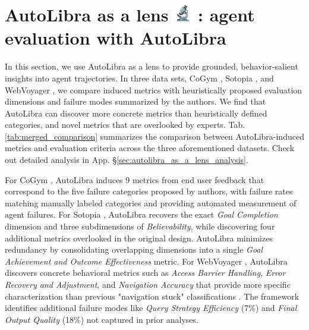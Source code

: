 \section{\texorpdfstring{AutoLibra as a lens
\includegraphics[height=1em]{figs/microscope.png}
: agent evaluation with AutoLibra}{AutoLibra as a lens: agent evaluation with AutoLibra}}
\label{sec:lens}

In this section, we use AutoLibra as a lens to provide grounded, behavior-salient
insights into agent trajectories. In three data sets, CoGym \citep{shao2024collaborative},
Sotopia \citep{zhousotopia}, and WebVoyager \citep{he2024webvoyager}, we compare
induced metrics with heuristically proposed evaluation dimensions and failure modes
summarized by the authors. We find that AutoLibra can discover more concrete
metrics than heuristically defined categories, and novel metrics that are overlooked
by experts. Tab. \ref{tab:merged_comparison} summarizes the comparison between AutoLibra-induced
metrics and evaluation criteria across the three aforementioned datasets. Check out detailed analysis in App. \S\ref{sec:autolibra_as_a_lens_analysis}.

For CoGym \citep{shao2024collaborative}, AutoLibra induces 9 metrics from end user feedback that correspond to the five failure categories proposed by authors, with failure rates matching manually labeled categories and providing automated measurement of agent failures.
For Sotopia \citep{zhousotopia}, AutoLibra recovers the exact \emph{Goal Completion} dimension and three subdimensions of \emph{Believability}, while discovering four additional metrics overlooked in the original design. AutoLibra minimizes redundancy by consolidating overlapping dimensions into a single \textit{Goal Achievement and Outcome Effectiveness} metric.
For WebVoyager \citep{he2024webvoyager}, AutoLibra discovers concrete behavioral metrics such as \textit{Access Barrier Handling}, \textit{Error Recovery and Adjustment}, and \textit{Navigation Accuracy} that provide more specific characterization than previous "navigation stuck" classifications \citep{he2024webvoyager,zhou2024proposeragentevaluatorpaeautonomousskilldiscovery}. The framework identifies additional failure modes like \textit{Query Strategy Efficiency} (7\%) and \textit{Final Output Quality} (18\%) not captured in prior analyses.


